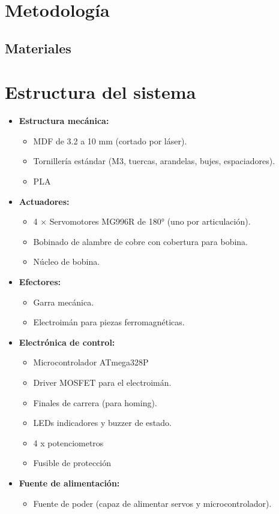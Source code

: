 \section{Metodología}
\subsection{Materiales}
\section*{Estructura del sistema}

\begin{itemize}[leftmargin=1.2cm]
  \item \textbf{Estructura mecánica:}
  \begin{itemize}
    \item MDF de 3.2 a 10 mm (cortado por láser).
    \item Tornillería estándar (M3, tuercas, arandelas, bujes, espaciadores).
    \item PLA
  \end{itemize}

  \item \textbf{Actuadores:}
  \begin{itemize}
    \item 4 × Servomotores MG996R de 180° (uno por articulación).
    \item Bobinado de alambre de cobre con cobertura para bobina.
    \item Núcleo de bobina.
  \end{itemize}

  \item \textbf{Efectores:}
  \begin{itemize}
    \item Garra mecánica.
    \item Electroimán para piezas ferromagnéticas.
  \end{itemize}

  \item \textbf{Electrónica de control:}
  \begin{itemize}
    \item Microcontrolador ATmega328P 
    \item Driver MOSFET  para el electroimán.
    \item Finales de carrera (para homing).
    \item LEDs indicadores y buzzer de estado.
    \item 4 x potenciometros
    \item Fusible de protección 
    
  \end{itemize}

  \item \textbf{Fuente de alimentación:}
  \begin{itemize}
    \item Fuente de poder (capaz de alimentar servos y microcontrolador).
  \end{itemize}
\end{itemize}
